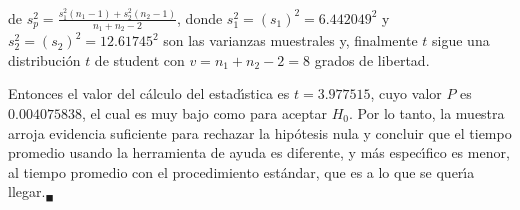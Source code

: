 \begin{solucion}
 de $s_p^2 = \frac{s_1^2 \left( n_1-1\right) +s_2^2\left( n_2-1\right)}{
 n_1+n_2-2}$, donde $s_1^2 = \left( s_1 \right)^2 = 6.442049^2$
 y $s_2^2 = \left( s_2 \right)^2 = 12.61745^2$
 son las varianzas muestrales y, finalmente $t$ sigue una distribuci\'on
 $t$ de student con $v = n_1 + n_2 - 2 = 8$ grados de libertad.
 \par 
 Entonces el valor del c\'alculo del estad\'{\i}stica es $t = 3.977515$,
 cuyo valor $P$ es $0.004075838$, el cual es muy bajo como para aceptar
 $H_0$. Por lo tanto, la muestra arroja evidencia suficiente
 para rechazar la hip\'otesis nula y concluir
 que el tiempo promedio usando la herramienta de ayuda es diferente,
 y m\'as espec\'{\i}fico es menor, al tiempo promedio
 con el procedimiento est\'andar,
 que es a lo que se quer\'{\i}a llegar.${}_{\blacksquare}$
\end{solucion}
